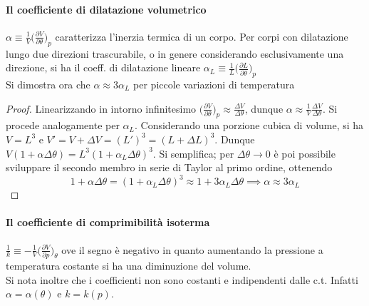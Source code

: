 \documentclass[10pt, oneside]{book}
\begin{document}
\paragraph{Il coefficiente di dilatazione volumetrico} $\displaystyle \alpha \equiv \frac{1}{V} \bigg(\frac{\partial V}{\partial \theta}\bigg)_p$ caratterizza l'inerzia termica di un corpo. Per corpi con dilatazione lungo due direzioni trascurabile, o in genere considerando esclusivamente una direzione, si ha il coeff. di dilatazione lineare $\displaystyle \alpha_L \equiv \frac{1}{L}\bigg(\frac{\partial L}{\partial \theta}\bigg)_p$
\\Si dimostra ora che $\alpha \approx 3 \alpha_L$ per piccole variazioni di temperatura
\begin{proof}
Linearizzando in intorno infinitesimo $\displaystyle \bigg(\frac{\partial V}{\partial \theta}\bigg)_p \approx \frac{\Delta V}{\Delta \theta}$, dunque $\alpha \approx \frac{1}{V} \frac{\Delta V}{\Delta \theta}$. Si procede analogamente per $\alpha_L$. Considerando una porzione cubica di volume, si ha $V = L^3$ e $V' = V + \Delta V = (L')^3 = (L + \Delta L)^3$. Dunque $\displaystyle V ( 1 + \alpha \Delta \theta) = L^3 (1 + \alpha_L \Delta \theta)^3$. Si semplifica; per $\Delta \theta \rightarrow 0$ è poi possibile sviluppare il secondo membro in serie di Taylor al primo ordine, ottenendo
\[1 + \alpha \Delta \theta = (1 + \alpha_L \Delta \theta)^3 \approx 1 + 3 \alpha_L \Delta \theta \implies \alpha \approx 3 \alpha_L\]
\end{proof}
\paragraph{Il coefficiente di comprimibilità isoterma} $\displaystyle \frac{1}{k} \equiv - \frac{1}{V} \bigg(\frac{\partial V}{\partial p}\bigg)_\theta$ ove il segno è negativo in quanto aumentando la pressione a temperatura costante si ha una diminuzione del volume.
\\Si nota inoltre che i coefficienti non sono costanti e indipendenti dalle c.t. Infatti $\alpha = \alpha(\theta)$ e $k = k(p)$.
\end{document}
